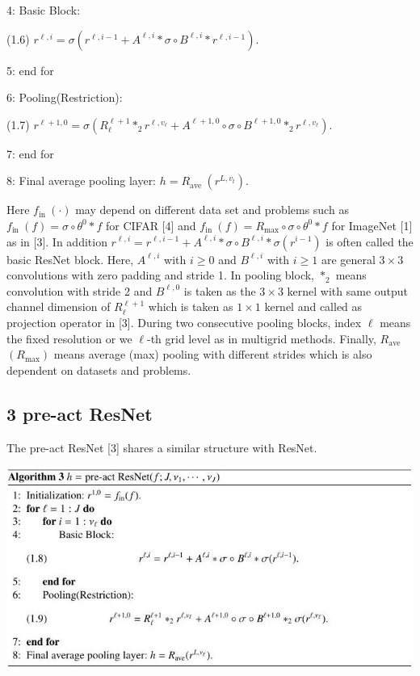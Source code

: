 \documentclass[10pt]{article}
\begin{document}
4: Basic Block:

(1.6) $r^{\ell, i}=\sigma\left(r^{\ell, i-1}+A^{\ell, i} * \sigma \circ B^{\ell, i} * r^{\ell, i-1}\right)$.

5: end for

6: Pooling(Restriction):

(1.7) $r^{\ell+1,0}=\sigma\left(R_{\ell}^{\ell+1} *_{2} r^{\ell, v_{\ell}}+A^{\ell+1,0} \circ \sigma \circ B^{\ell+1,0} *_{2} r^{\ell, v_{\ell}}\right) .$

7: end for

8: Final average pooling layer: $h=R_{\text {ave }}\left(r^{L, v_{t}}\right)$.

Here $f_{\text {in }}(\cdot)$ may depend on different data set and problems such as $f_{\text {in }}(f)=\sigma \circ \theta^{0} * f$ for CIFAR [4] and $f_{\text {in }}(f)=R_{\max } \circ \sigma \circ \theta^{0} * f$ for ImageNet [1] as in [3]. In addition $r^{\ell, i}=r^{\ell, i-1}+A^{\ell, i} * \sigma \circ B^{\ell, i} * \sigma\left(r^{i-1}\right)$ is often called the basic ResNet block. Here, $A^{\ell, i}$ with $i \geq 0$ and $B^{\ell, i}$ with $i \geq 1$ are general $3 \times 3$ convolutions with zero padding and stride 1. In pooling block, $*_{2}$ means convolution with stride 2 and $B^{\ell, 0}$ is taken as the $3 \times 3$ kernel with same output channel dimension of $R_{\ell}^{\ell+1}$ which is taken as $1 \times 1$ kernel and called as projection operator in [3]. During two consecutive pooling blocks, index $\ell$ means the fixed resolution or we $\ell$-th grid level as in multigrid methods. Finally, $R_{\mathrm{ave}}$ $\left(R_{\max }\right)$ means average (max) pooling with different strides which is also dependent on datasets and problems.

\subsection{3 pre-act ResNet}
The pre-act ResNet [3] shares a similar structure with ResNet.

\includegraphics[max width=\textwidth]{2022_01_06_73aade67e8906ae5893fg-5}
\end{document}
